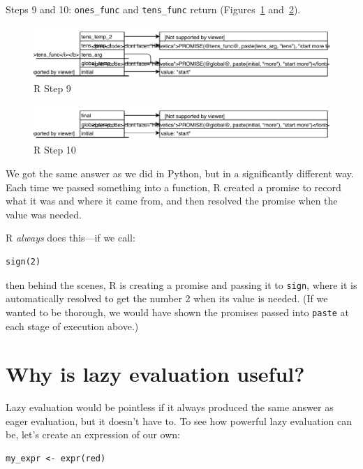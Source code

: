 Steps 9 and 10:
\texttt{ones\_func} and \texttt{tens\_func} return
(Figures~\ref{fig:r-step-9} and~\ref{fig:r-step-10}).

\begin{figure}[h]
  \includegraphics{figures/nse/r-step-09.pdf}
  \caption{R Step 9}
  \label{fig:r-step-9}
\end{figure}

\begin{figure}[h]
  \includegraphics{figures/nse/r-step-10.pdf}
  \caption{R Step 10}
  \label{fig:r-step-10}
\end{figure}

We got the same answer as we did in Python,
but in a significantly different way.
Each time we passed something into a function,
R created a promise to record what it was and where it came from,
and then resolved the promise when the value was needed.

R \emph{always} does this---if we call:

\begin{lstlisting}
sign(2)
\end{lstlisting}

\noindent
then behind the scenes,
R is creating a promise and passing it to \texttt{sign},
where it is automatically resolved to get the number 2 when its value is needed.
(If we wanted to be thorough,
we would have shown the promises passed into \texttt{paste} at each stage of execution above.)

\section{Why is lazy evaluation useful?}

Lazy evaluation would be pointless if it always produced the same answer as eager evaluation,
but it doesn't have to.
To see how powerful lazy evaluation can be,
let's create an expression of our own:

\begin{lstlisting}
my_expr <- expr(red)
\end{lstlisting}


